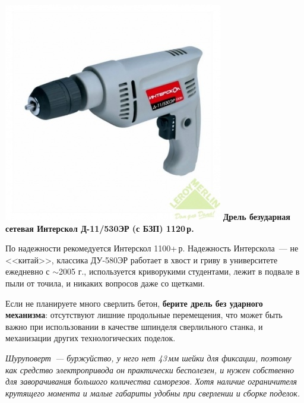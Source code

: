 \documentclass{magazine}
\begin{document}
{\noindent\href{http://leroymerlin.ru/catalogue/instrumenty/elektroinstrument/dreli\_bezudarnye/11857763/}{
\includegraphics[width=\columnwidth]{fig/00/D_11_530ER.jpg}}
\textbf{Дрель безударная сетевая Интерскол Д-11/530ЭР (с БЗП) 1120\,р.}

По надежности рекомедуется Интерскол
1100+\,р. Надежность Интерскола\ --- не <<китай>>, классика ДУ-580ЭР
работает в хвост и гриву в университете ежедневно с $\sim$2005 г., используется
криворукими студентами, лежит в подвале в пыли от точила, и никаких вопросов
даже со щетками.

Если не планируете много сверлить бетон, \textbf{берите дрель без ударного
механизма}: отсутствуют лишние продольные перемещения, что может быть важно при
использовании в качестве шпинделя сверлильного станка, и механизации других
технологических поделок.

\emph{Шуруповерт\ --- буржуйство, у него нет 43\,мм шейки для фиксации, поэтому
как средство электропривода он практически бесполезен, и нужен собственно для
заворачивания большого количества саморезов. Хотя наличие ограничителя
крутящего момента и малые габариты удобны при сверлении и сборке поделок.}


}
\end{document}

